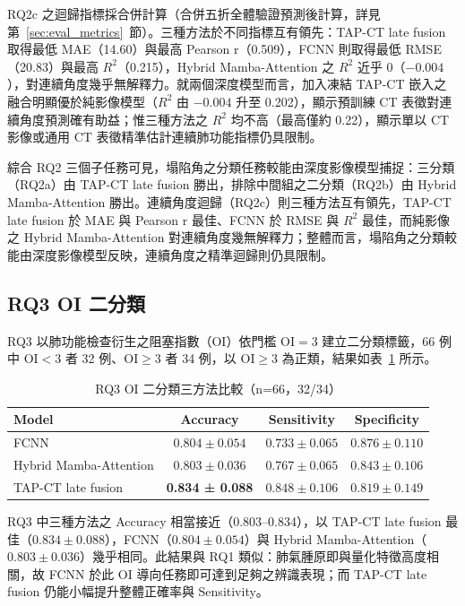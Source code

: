 \begin{ZhChapter}
RQ2c 之迴歸指標採合併計算（合併五折全體驗證預測後計算，詳見第~\ref{sec:eval_metrics}~節）。三種方法於不同指標互有領先：TAP-CT late fusion 取得最低 MAE（14.60）與最高 Pearson r（0.509），FCNN 則取得最低 RMSE（20.83）與最高 \(R^2\)（0.215），Hybrid Mamba-Attention 之 \(R^2\) 近乎 0（\(-0.004\)），對連續角度幾乎無解釋力。就兩個深度模型而言，加入凍結 TAP-CT 嵌入之融合明顯優於純影像模型（\(R^2\) 由 \(-0.004\) 升至 0.202），顯示預訓練 CT 表徵對連續角度預測確有助益；惟三種方法之 \(R^2\) 均不高（最高僅約 0.22），顯示單以 CT 影像或通用 CT 表徵精準估計連續肺功能指標仍具限制。

綜合 RQ2 三個子任務可見，塌陷角之分類任務較能由深度影像模型捕捉：三分類（RQ2a）由 TAP-CT late fusion 勝出，排除中間組之二分類（RQ2b）由 Hybrid Mamba-Attention 勝出。連續角度迴歸（RQ2c）則三種方法互有領先，TAP-CT late fusion 於 MAE 與 Pearson r 最佳、FCNN 於 RMSE 與 \(R^2\) 最佳，而純影像之 Hybrid Mamba-Attention 對連續角度幾無解釋力；整體而言，塌陷角之分類較能由深度影像模型反映，連續角度之精準迴歸則仍具限制。

\FloatBarrier

\subsection{RQ3 OI 二分類}

RQ3 以肺功能檢查衍生之阻塞指數（OI）依門檻 OI$=3$ 建立二分類標籤，66 例中 OI$<3$ 者 32 例、OI$\geq 3$ 者 34 例，以 OI$\geq 3$ 為正類，結果如表~\ref{tab:rq3_oi} 所示。

\begin{table}[htbp]
\centering
\caption{RQ3 OI 二分類三方法比較（n=66，32/34）}
\label{tab:rq3_oi}
\begingroup
\renewcommand{\arraystretch}{1.25}
\begin{tabularx}{0.95\textwidth}{>{\raggedright\arraybackslash}X c c c}
\hline
Model & Accuracy & Sensitivity & Specificity \\
\hline
FCNN & \(0.804 \pm 0.054\) & \(0.733 \pm 0.065\) & \(0.876 \pm 0.110\) \\
Hybrid Mamba-Attention & \(0.803 \pm 0.036\) & \(0.767 \pm 0.065\) & \(0.843 \pm 0.106\) \\
TAP-CT late fusion & \textbf{0.834 ± 0.088} & \(0.848 \pm 0.106\) & \(0.819 \pm 0.149\) \\
\hline
\end{tabularx}
\endgroup
\end{table}

RQ3 中三種方法之 Accuracy 相當接近（0.803--0.834），以 TAP-CT late fusion 最佳（\(0.834 \pm 0.088\)），FCNN（\(0.804 \pm 0.054\)）與 Hybrid Mamba-Attention（\(0.803 \pm 0.036\)）幾乎相同。此結果與 RQ1 類似：肺氣腫原即與量化特徵高度相關，故 FCNN 於此 OI 導向任務即可達到足夠之辨識表現；而 TAP-CT late fusion 仍能小幅提升整體正確率與 Sensitivity。


\end{ZhChapter}
